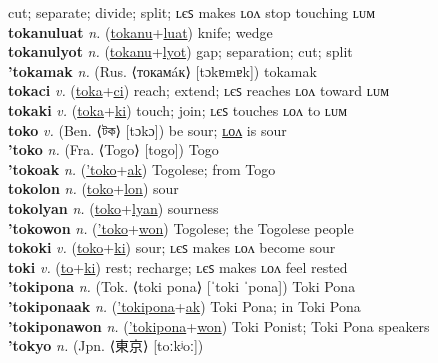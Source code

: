 cut; separate; divide; split; ʟєꜱ makes ʟᴏᴧ stop touching ʟᴜᴍ \label{tokanu} \\
\textbf{tokanuluat} \textit{n.} (\hyperref[tokanu]{tokanu}+\hyperref[luat]{luat})
knife; wedge \label{tokanuluat} \\
\textbf{tokanulyot} \textit{n.} (\hyperref[tokanu]{tokanu}+\hyperref[lyot]{lyot})
gap; separation; cut; split \label{tokanulyot} \\
\textbf{'tokamak} \textit{n.} (Rus. ⟨токамáк⟩ [tɔkɐmɐk])
tokamak \label{'tokamak} \\
\textbf{tokaci} \textit{v.} (\hyperref[toka]{toka}+\hyperref[ci]{ci})
reach; extend; ʟєꜱ reaches ʟᴏᴧ toward ʟᴜᴍ \label{tokaci} \\
\textbf{tokaki} \textit{v.} (\hyperref[toka]{toka}+\hyperref[ki]{ki})
touch; join; ʟєꜱ touches ʟᴏᴧ to ʟᴜᴍ \label{tokaki} \\
\textbf{toko} \textit{v.} (Ben. ⟨টক⟩ [tɔkɔ])
be sour; \hyperref[tokolon]{ʟᴏᴧ} is sour \label{toko} \\
\textbf{'toko} \textit{n.} (Fra. ⟨Togo⟩ [togo])
Togo \label{'toko} \\
\textbf{'tokoak} \textit{n.} (\hyperref['toko]{'toko}+\hyperref[ak]{ak})
Togolese; from Togo \label{'tokoak} \\
\textbf{tokolon} \textit{n.} (\hyperref[toko]{toko}+\hyperref[lon]{lon})
sour \label{tokolon} \\
\textbf{tokolyan} \textit{n.} (\hyperref[toko]{toko}+\hyperref[lyan]{lyan})
sourness \label{tokolyan} \\
\textbf{'tokowon} \textit{n.} (\hyperref['toko]{'toko}+\hyperref[won]{won})
Togolese; the Togolese people \label{'tokowon} \\
\textbf{tokoki} \textit{v.} (\hyperref[toko]{toko}+\hyperref[ki]{ki})
sour; ʟєꜱ makes ʟᴏᴧ become sour \label{tokoki} \\
\textbf{toki} \textit{v.} (\hyperref[to]{to}+\hyperref[ki]{ki})
rest; recharge; ʟєꜱ makes ʟᴏᴧ feel rested \label{toki} \\
\textbf{'tokipona} \textit{n.} (Tok. ⟨toki pona⟩ [ˈtoki ˈpona])
Toki Pona \label{'tokipona} \\
\textbf{'tokiponaak} \textit{n.} (\hyperref['tokipona]{'tokipona}+\hyperref[ak]{ak})
Toki Pona; in Toki Pona \label{'tokiponaak} \\
\textbf{'tokiponawon} \textit{n.} (\hyperref['tokipona]{'tokipona}+\hyperref[won]{won})
Toki Ponist; Toki Pona speakers \label{'tokiponawon} \\
\textbf{'tokyo} \textit{n.} (Jpn. ⟨東京⟩ [toːkʲoː])
